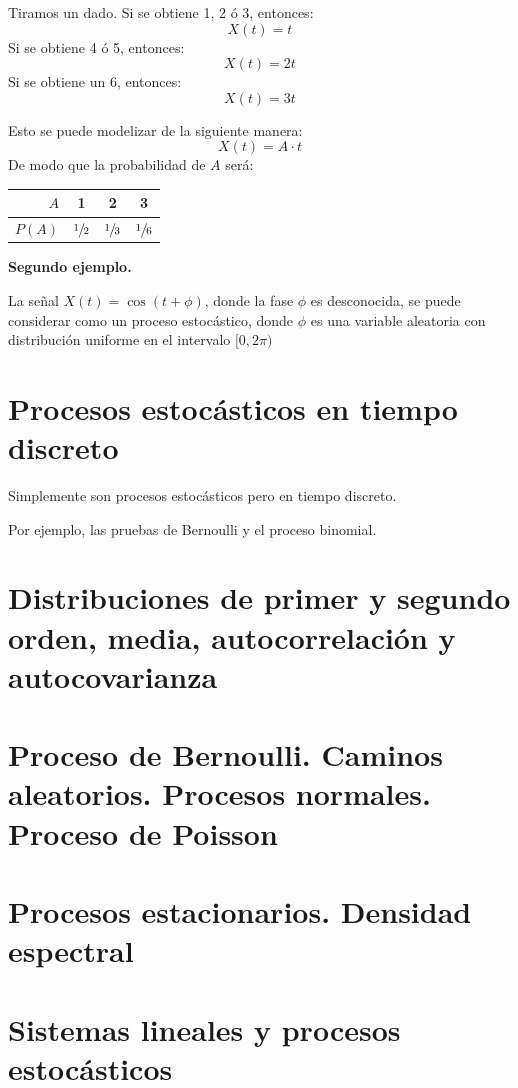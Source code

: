 \documentclass[a4paper]{book}
\begin{document}
Tiramos un dado. Si se obtiene 1, 2 ó 3, entonces:
\[X(t) = t\]
Si se obtiene 4 ó 5, entonces:
\[X(t) = 2t\]
Si se obtiene un 6, entonces:
\[X(t) = 3t\]

Esto se puede modelizar de la siguiente manera:
\[X(t) = A\cdot t\]
De modo que la probabilidad de $A$ será:
\begin{center}
	\begin{tabular}{r || c | c | c}
		$A$    & 1              & 2              & 3              \\ \hline
		$P(A)$ & $\sfrac{1}{2}$ & $\sfrac{1}{3}$ & $\sfrac{1}{6}$
	\end{tabular}
\end{center}

\textbf{Segundo ejemplo.}

La señal $X(t) = \cos\left( t+\phi \right)$, donde la fase $\phi$ es desconocida, se puede considerar como un proceso estocástico, donde $\phi$ es una variable aleatoria con distribución uniforme en el intervalo $[0, 2\pi )$




\section{Procesos estocásticos en tiempo discreto}

Simplemente son procesos estocásticos pero en tiempo discreto.

Por ejemplo, las pruebas de Bernoulli y el proceso binomial.



\section{Distribuciones de primer y segundo orden, media, autocorrelación y autocovarianza}

\section{Proceso de Bernoulli. Caminos aleatorios. Procesos normales. Proceso de Poisson}

\section{Procesos estacionarios. Densidad espectral}

\section{Sistemas lineales y procesos estocásticos}
\end{document}
